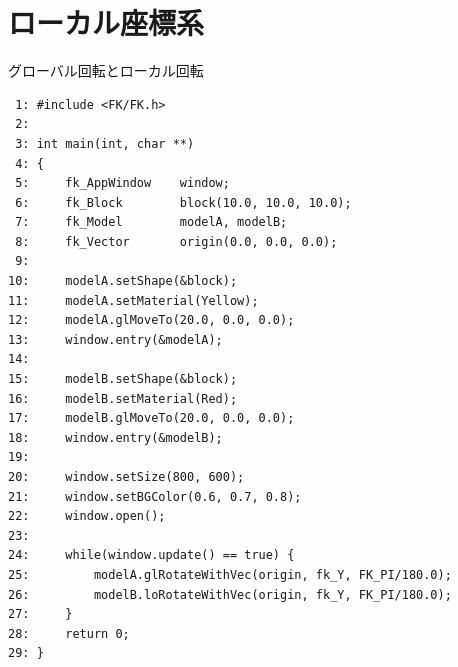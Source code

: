 \section{ローカル座標系} \label{sec:06-local}
\begin{itembox}[l]{グローバル回転とローカル回転}
\begin{verbatim}
 1: #include <FK/FK.h>
 2: 
 3: int main(int, char **)
 4: {
 5:     fk_AppWindow    window;
 6:     fk_Block        block(10.0, 10.0, 10.0);
 7:     fk_Model        modelA, modelB;
 8:     fk_Vector       origin(0.0, 0.0, 0.0);
 9: 
10:     modelA.setShape(&block);
11:     modelA.setMaterial(Yellow);
12:     modelA.glMoveTo(20.0, 0.0, 0.0);
13:     window.entry(&modelA);
14: 
15:     modelB.setShape(&block);
16:     modelB.setMaterial(Red);
17:     modelB.glMoveTo(20.0, 0.0, 0.0);
18:     window.entry(&modelB);
19: 
20:     window.setSize(800, 600);
21:     window.setBGColor(0.6, 0.7, 0.8);
22:     window.open();
23: 
24:     while(window.update() == true) {
25:         modelA.glRotateWithVec(origin, fk_Y, FK_PI/180.0);
26:         modelB.loRotateWithVec(origin, fk_Y, FK_PI/180.0);
27:     }
28:     return 0;
29: }

\end{verbatim}
\end{itembox}

